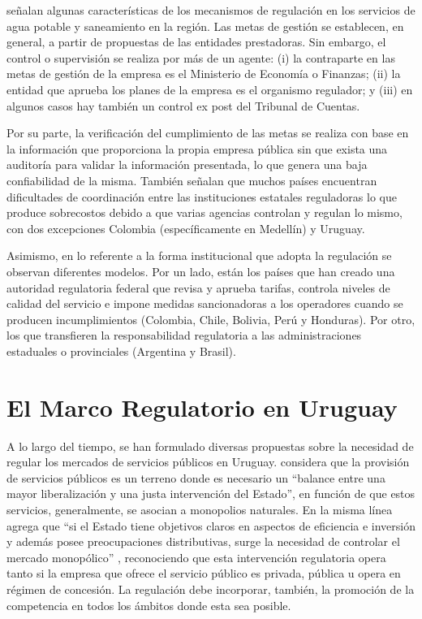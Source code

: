\documentclass[
  12pt,
  spanish,
]{book}
\begin{document}
\citet{Rozas2013} señalan algunas características de los mecanismos de regulación en los servicios de agua potable y saneamiento en la región. Las metas de gestión se establecen, en general, a partir de propuestas de las entidades prestadoras. Sin embargo, el control o supervisión se realiza por más de un agente: (i) la contraparte en las metas de gestión de la empresa es el Ministerio de Economía o Finanzas; (ii) la entidad que aprueba los planes de la empresa es el organismo regulador; y (iii) en algunos casos hay también un control ex post del Tribunal de Cuentas.

Por su parte, la verificación del cumplimiento de las metas se realiza con base en la información que proporciona la propia empresa pública sin que exista una auditoría para validar la información presentada, lo que genera una baja confiabilidad de la misma. También señalan que muchos países encuentran dificultades de coordinación entre las instituciones estatales reguladoras lo que produce sobrecostos debido a que varias agencias controlan y regulan lo mismo, con dos excepciones Colombia (específicamente en Medellín) y Uruguay.

Asimismo, en lo referente a la forma institucional que adopta la regulación se observan diferentes modelos. Por un lado, están los países que han creado una autoridad regulatoria federal que revisa y aprueba tarifas, controla niveles de calidad del servicio e impone medidas sancionadoras a los operadores cuando se producen incumplimientos (Colombia, Chile, Bolivia, Perú y Honduras). Por otro, los que transfieren la responsabilidad regulatoria a las administraciones estaduales o provinciales (Argentina y Brasil).

\hypertarget{el-marco-regulatorio-en-uruguay}{%
\section{El Marco Regulatorio en Uruguay}\label{el-marco-regulatorio-en-uruguay}}

A lo largo del tiempo, se han formulado diversas propuestas sobre la necesidad de regular los mercados de servicios públicos en Uruguay. \citet{Bergara2001} considera que la provisión de servicios públicos es un terreno donde es necesario un ``balance entre una mayor liberalización y una justa intervención del Estado'', en función de que estos servicios, generalmente, se asocian a monopolios naturales. En la misma línea agrega que ``si el Estado tiene objetivos claros en aspectos de eficiencia e inversión y además posee preocupaciones distributivas, surge la necesidad de controlar el mercado monopólico'' \citep[p.~38]{Bergara2001}, reconociendo que esta intervención regulatoria opera tanto si la empresa que ofrece el servicio público es privada, pública u opera en régimen de concesión. La regulación debe incorporar, también, la promoción de la competencia en todos los ámbitos donde esta sea posible.
\end{document}
